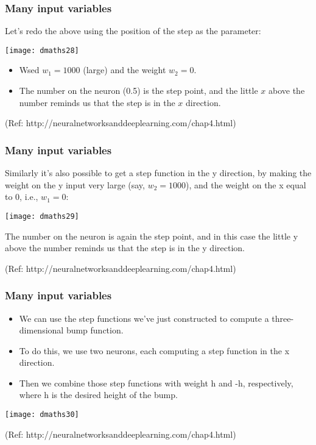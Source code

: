 \begin{frame}[fragile] \frametitle{Many input variables}
Let's redo the above using the position of the step as the parameter:

\begin{center}
\texttt{[image: dmaths28]}
\end{center}


\begin{itemize}
\item Wsed $w_1=1000$ (large) and the weight $w_2=0$. 
\item The number on the neuron (0.5) is the step point, and the little $x$ above the number reminds us that the step is in the $x$ direction.
\end{itemize}


{\tiny (Ref: http://neuralnetworksanddeeplearning.com/chap4.html)}
\end{frame}


\begin{frame}[fragile] \frametitle{Many input variables}
Similarly it's also possible to get a step function in the y direction, by making the weight on the y input very large (say, $w_2=1000$), and the weight on the x equal to 0, i.e., $w_1=0$:

\begin{center}
\texttt{[image: dmaths29]}
\end{center}


The number on the neuron is again the step point, and in this case the little y above the number reminds us that the step is in the y direction. 

{\tiny (Ref: http://neuralnetworksanddeeplearning.com/chap4.html)}
\end{frame}


\begin{frame}[fragile] \frametitle{Many input variables}

\begin{itemize}
\item We can use the step functions we've just constructed to compute a three-dimensional bump function.
\item  To do this, we use two neurons, each computing a step function in the x direction. 
\item Then we combine those step functions with weight h and -h, respectively, where h is the desired height of the bump.
\end{itemize}

\begin{center}
\texttt{[image: dmaths30]}
\end{center}
{\tiny (Ref: http://neuralnetworksanddeeplearning.com/chap4.html)}
\end{frame}

